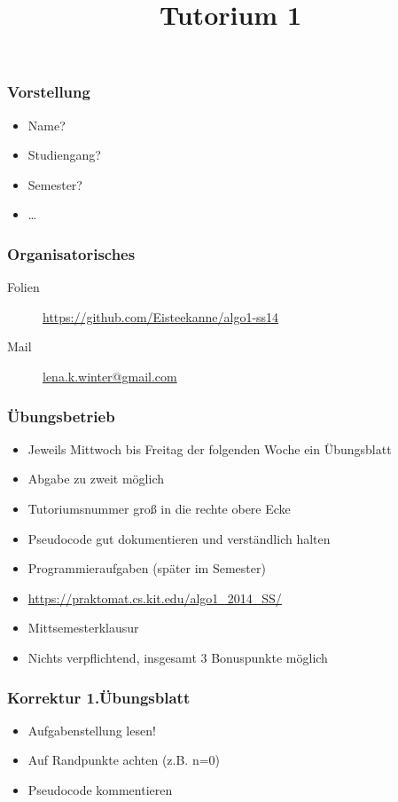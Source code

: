 
\title[Algorithmen I SS 14]{Tutorium 1}



\begin{frame}
  \maketitle
\end{frame}

\begin{frame}
	\frametitle{Vorstellung}
	\begin{itemize}
		\item Name?
		\item Studiengang?
		\item Semester?
		\item …
	\end{itemize}
\end{frame}

\begin{frame}
	\frametitle{Organisatorisches}
	\begin{description}
		\item[Folien] \url{https://github.com/Eisteekanne/algo1-ss14}
		\item[Mail] \href{mailto:lena.k.winter@gmail.com}{lena.k.winter@gmail.com}
	\end{description}
\end{frame}

\begin{frame}
	\frametitle{Übungsbetrieb}
	\begin{itemize}
		\item Jeweils Mittwoch bis Freitag der folgenden Woche ein Übungsblatt
		\item Abgabe zu zweit möglich
		\item Tutoriumsnummer groß in die rechte obere Ecke
		\item Pseudocode gut dokumentieren und verständlich halten
		\item Programmieraufgaben (später im Semester)
		\item \url{https://praktomat.cs.kit.edu/algo1_2014_SS/}
		\item Mittsemesterklausur
		\item Nichts verpflichtend, insgesamt 3 Bonuspunkte möglich
	\end{itemize}
\end{frame}

\begin{frame}
	\frametitle{Korrektur 1.Übungsblatt}
	\begin{itemize}
		\item Aufgabenstellung lesen!
		\item Auf Randpunkte achten (z.B. n=0)
		\item Pseudocode kommentieren
	\end{itemize}

\end{frame}

